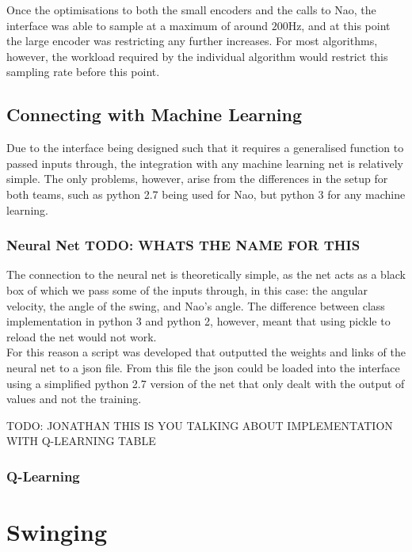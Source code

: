 \documentclass[11pt]{article}
\begin{document}
Once the optimisations to both the small encoders and the calls to Nao, the interface was able to sample at a maximum of around $200$Hz, and at this point the large encoder was restricting any further increases. For most algorithms, however, the workload required by the individual algorithm would restrict this sampling rate before this point. 

\subsection{Connecting with Machine Learning}
Due to the interface being designed such that it requires a generalised function to passed inputs through, the integration with any machine learning net is relatively simple. The only problems, however, arise from the differences in the setup for both teams, such as python 2.7 being used for Nao, but python 3 for any machine learning.

\subsubsection{Neural Net TODO: WHATS THE NAME FOR THIS}
The connection to the neural net is theoretically simple, as the net acts as a black box of which we pass some of the inputs through, in this case: the angular velocity, the angle of the swing, and Nao's angle. The difference between class implementation in python 3 and python 2, however, meant that using pickle to reload the net would not work. \\

For this reason a script was developed that outputted the weights and links of the neural net to a json file. From this file the json could be loaded into the interface using a simplified python 2.7 version of the net that only dealt with the output of values and not the training.

TODO: JONATHAN THIS IS YOU TALKING ABOUT IMPLEMENTATION WITH Q-LEARNING TABLE
\subsubsection{Q-Learning}


\section{Swinging}
\end{document}

